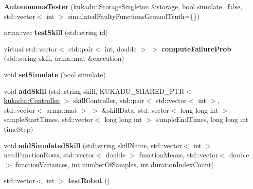 \begin{DoxyCompactItemize}
\item 
{\bfseries Autonomous\+Tester} (\hyperlink{classkukadu_1_1StorageSingleton}{kukadu\+::\+Storage\+Singleton} \&storage, bool simulate=false, std\+::vector$<$ int $>$ simulated\+Faulty\+Functions\+Ground\+Truth=\{\})\hypertarget{classkukadu_1_1AutonomousTester_af24195b356026f7dd1d815f5810a4bb8}{}\label{classkukadu_1_1AutonomousTester_af24195b356026f7dd1d815f5810a4bb8}

\item 
arma\+::vec {\bfseries test\+Skill} (std\+::string id)\hypertarget{classkukadu_1_1AutonomousTester_a7303cffd19cf8000780af34feb5c507f}{}\label{classkukadu_1_1AutonomousTester_a7303cffd19cf8000780af34feb5c507f}

\item 
virtual std\+::vector$<$ std\+::pair$<$ int, double $>$ $>$ {\bfseries compute\+Failure\+Prob} (std\+::string skill, arma\+::mat \&execution)\hypertarget{classkukadu_1_1AutonomousTester_a06eefdb2f465d50edb534cbdb5444a61}{}\label{classkukadu_1_1AutonomousTester_a06eefdb2f465d50edb534cbdb5444a61}

\item 
void {\bfseries set\+Simulate} (bool simulate)\hypertarget{classkukadu_1_1AutonomousTester_a9aecdf9210317b4831cfa1a218c517b2}{}\label{classkukadu_1_1AutonomousTester_a9aecdf9210317b4831cfa1a218c517b2}

\item 
void {\bfseries add\+Skill} (std\+::string skill, K\+U\+K\+A\+D\+U\+\_\+\+S\+H\+A\+R\+E\+D\+\_\+\+P\+TR$<$ \hyperlink{classkukadu_1_1Controller}{kukadu\+::\+Controller} $>$ skill\+Controller, std\+::pair$<$ std\+::vector$<$ int $>$, std\+::vector$<$ arma\+::mat $>$ $>$ \&skill\+Data, std\+::vector$<$ long long int $>$ sample\+Start\+Times, std\+::vector$<$ long long int $>$ sample\+End\+Times, long long int time\+Step)\hypertarget{classkukadu_1_1AutonomousTester_a64448f5e619edb379ce4b757018b2db1}{}\label{classkukadu_1_1AutonomousTester_a64448f5e619edb379ce4b757018b2db1}

\item 
void {\bfseries add\+Simulated\+Skill} (std\+::string skill\+Name, std\+::vector$<$ int $>$ used\+Function\+Rows, std\+::vector$<$ double $>$ function\+Means, std\+::vector$<$ double $>$ function\+Variances, int number\+Of\+Samples, int duration\+Index\+Count)\hypertarget{classkukadu_1_1AutonomousTester_afc97b992b4db8d85284088d1e5fe5215}{}\label{classkukadu_1_1AutonomousTester_afc97b992b4db8d85284088d1e5fe5215}

\item 
std\+::vector$<$ int $>$ {\bfseries test\+Robot} ()\hypertarget{classkukadu_1_1AutonomousTester_a9ae896125cd8782d66fcf6056b30814d}{}\label{classkukadu_1_1AutonomousTester_a9ae896125cd8782d66fcf6056b30814d}

\end{DoxyCompactItemize}


